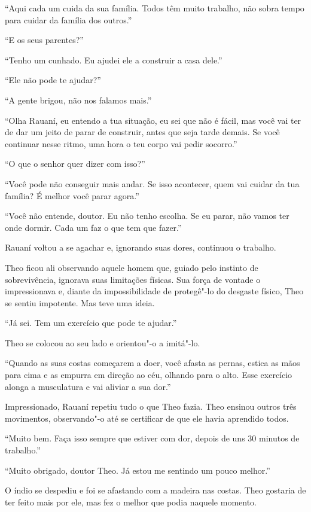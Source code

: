 ``Aqui cada um cuida da sua família. Todos têm muito trabalho, não sobra
tempo para cuidar da família dos outros.''

``E os seus parentes?''

``Tenho um cunhado. Eu ajudei ele a construir a casa dele.''

``Ele não pode te ajudar?''

``A gente brigou, não nos falamos mais.''

``Olha Rauaní, eu entendo a tua situação, eu sei que não é fácil, mas
você vai ter de dar um jeito de parar de construir, antes que seja tarde
demais. Se você continuar nesse ritmo, uma hora o teu corpo vai pedir
socorro.''

``O que o senhor quer dizer com isso?''

``Você pode não conseguir mais andar. Se isso acontecer, quem vai cuidar
da tua família? É melhor você parar agora.''

``Você não entende, doutor. Eu não tenho escolha. Se eu parar, não vamos
ter onde dormir. Cada um faz o que tem que fazer.''

Rauaní voltou a se agachar e, ignorando suas dores, continuou o
trabalho.

Theo ficou ali observando aquele homem que, guiado
pelo instinto de sobrevivência, ignorava suas limitações físicas. Sua
força de vontade o impressionava e, diante da impossibilidade de
protegê"-lo do desgaste físico, Theo se sentiu impotente. Mas teve uma
ideia.

``Já sei. Tem um exercício que pode te ajudar.''

Theo se colocou ao seu lado e orientou"-o a imitá"-lo.

``Quando as suas costas começarem a doer, você afasta as pernas, estica
as mãos para cima e as empurra em direção ao céu, olhando para o alto.
Esse exercício alonga a musculatura e vai aliviar a sua dor.''

Impressionado, Rauaní repetiu tudo o que Theo fazia. Theo ensinou outros
três movimentos, observando"-o até se certificar de que ele havia
aprendido todos.

``Muito bem. Faça isso sempre que estiver com dor, depois de uns 30
minutos de trabalho.''

``Muito obrigado, doutor Theo. Já estou me sentindo um pouco melhor.''

O índio se despediu e foi se afastando com a madeira nas costas. Theo
gostaria de ter feito mais por ele, mas fez o melhor que podia naquele
momento.

